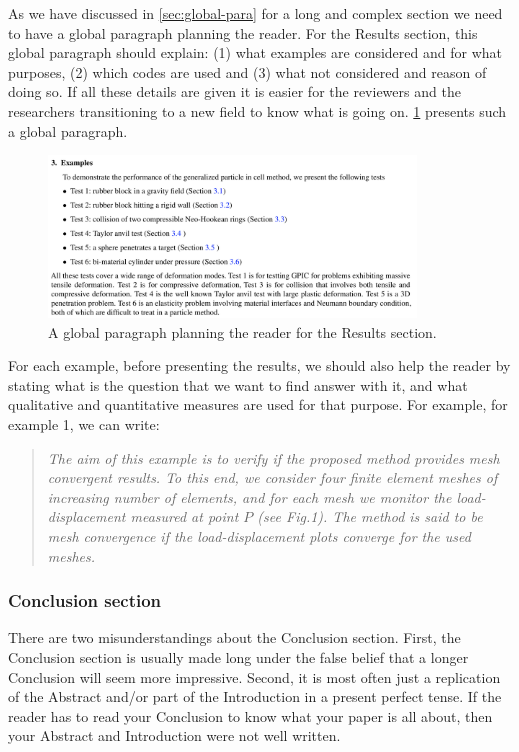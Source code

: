 \documentclass[authoryear,12pta4paper,fleqn]{article}
\numberwithin{equation}{section}
\theoremstyle{remark}
\begin{document}
As we have discussed in \cref{sec:global-para} for a long and complex section we need to have a global paragraph planning the reader. For the Results section, this global paragraph should explain: (1) what examples are considered and for what purposes, (2) which codes are used and (3) what not considered and reason of doing so. If all these details are given it is easier for the reviewers and the researchers transitioning to a new field to know what is going on. \cref{fig:examples} presents such a global paragraph.

\begin{figure}[h!]
\centering
\includegraphics[width=0.87\textwidth]{examples}
\caption{A global paragraph planning the reader for the Results section.}
\label{fig:examples}
\end{figure}

For each example, before presenting the results, we should also help the reader by stating what is the question that we want to find answer with it, and what qualitative and quantitative measures are used for that purpose. For example, for example 1, we can write:

\begin{quote}
  \textit{
  The aim of this example is to verify if the proposed method provides mesh convergent results. To this end, we consider four finite element meshes of increasing number of elements, and for each mesh we monitor the load-displacement measured at point $P$ (see Fig.1). The method is said to be mesh convergence if the load-displacement plots converge for the used meshes.
  }
\end{quote}

\subsubsection{Conclusion section}\label{sec:conclusion-part}

There are two misunderstandings about the Conclusion section. First, the Conclusion section is usually made long under the false belief that a longer Conclusion will seem more impressive. Second, it is most often just a replication of the Abstract and/or part of the Introduction in a present perfect tense. If the reader has to read your Conclusion to know what your paper is all about, then your Abstract and Introduction were not well written.
\end{document}
